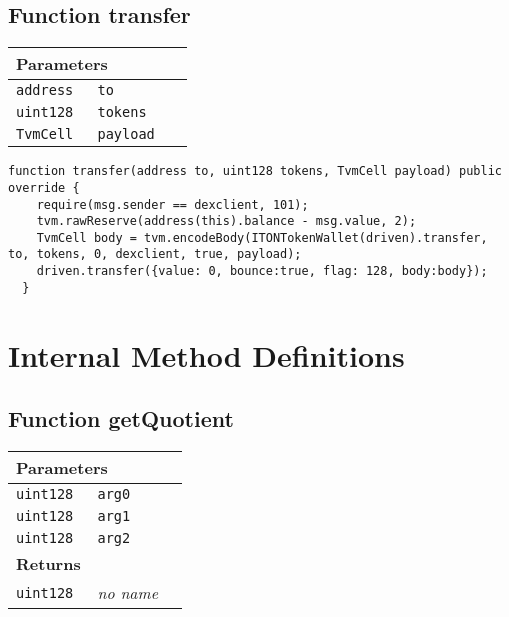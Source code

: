 \subsection{Function transfer}


\ifsoltables
\noindent\begin{tabular}{|l|l|p{5cm}|}\hline
\multicolumn{3}{|l|}{\bf Parameters}\\\hline
\tt address & \tt to &\\\hline
\tt uint128 & \tt tokens &\\\hline
\tt TvmCell & \tt payload &\\\hline
\end{tabular}
\fi

\vspace{2cm}

\begin{lstlisting}[firstnumber=108]
  function transfer(address to, uint128 tokens, TvmCell payload) public override {
    require(msg.sender == dexclient, 101);
    tvm.rawReserve(address(this).balance - msg.value, 2);
    TvmCell body = tvm.encodeBody(ITONTokenWallet(driven).transfer, to, tokens, 0, dexclient, true, payload);
    driven.transfer({value: 0, bounce:true, flag: 128, body:body});
  }
\end{lstlisting}

\section{Internal Method Definitions}


\subsection{Function getQuotient}


\ifsoltables
\noindent\begin{tabular}{|l|l|p{5cm}|}\hline
\multicolumn{3}{|l|}{\bf Parameters}\\\hline
\tt uint128 & \tt arg0 &\\\hline
\tt uint128 & \tt arg1 &\\\hline
\tt uint128 & \tt arg2 &\\\hline
\multicolumn{3}{|l|}{\bf Returns}\\\hline
\tt uint128 & {\em no name} &\\\hline
\end{tabular}
\fi

\vspace{2cm}

